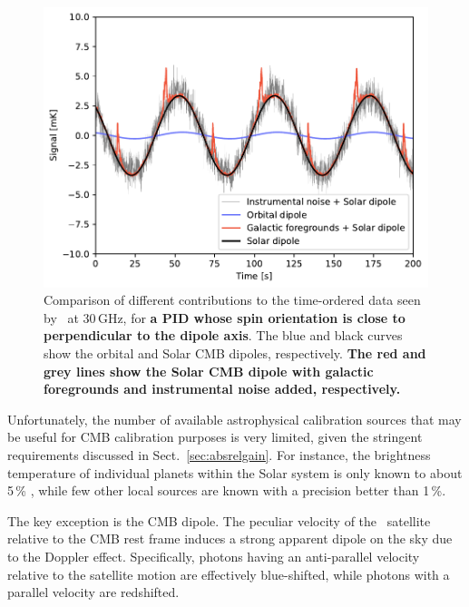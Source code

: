 \documentclass[twocolumn]{aa}
\begin{document}
\begin{figure}[t]
  \center
  \includegraphics[width=\linewidth]{figs/dipole_comparison.pdf}
    \caption{Comparison of different contributions to the time-ordered
      data seen by \Planck\ at 30\,GHz, for \textbf{a PID whose spin orientation is close to perpendicular to the dipole axis}. The blue and black curves
      show the orbital and Solar CMB
      dipoles, respectively. \textbf{The red and grey lines show the Solar CMB dipole with galactic foregrounds and instrumental noise added, respectively.}}
  \label{fig:dipole_strengths}
\end{figure}

Unfortunately, the number of available astrophysical calibration
sources that may be useful for CMB calibration purposes is very
limited, given the stringent requirements discussed in
Sect.~\ref{sec:absrelgain}. For instance, the brightness temperature
of individual planets within the Solar system is only known to about
5\,\% \citep{planck2014-a09}, while few other local sources are known
with a precision better than 1\,\%.

The key exception is the CMB dipole. The peculiar velocity of the
\Planck\ satellite relative to the CMB rest frame induces a strong
apparent dipole on the sky due to the Doppler effect. Specifically,
photons having an anti-parallel velocity relative to the satellite
motion are effectively blue-shifted, while photons with a parallel
velocity are redshifted.
\end{document}
